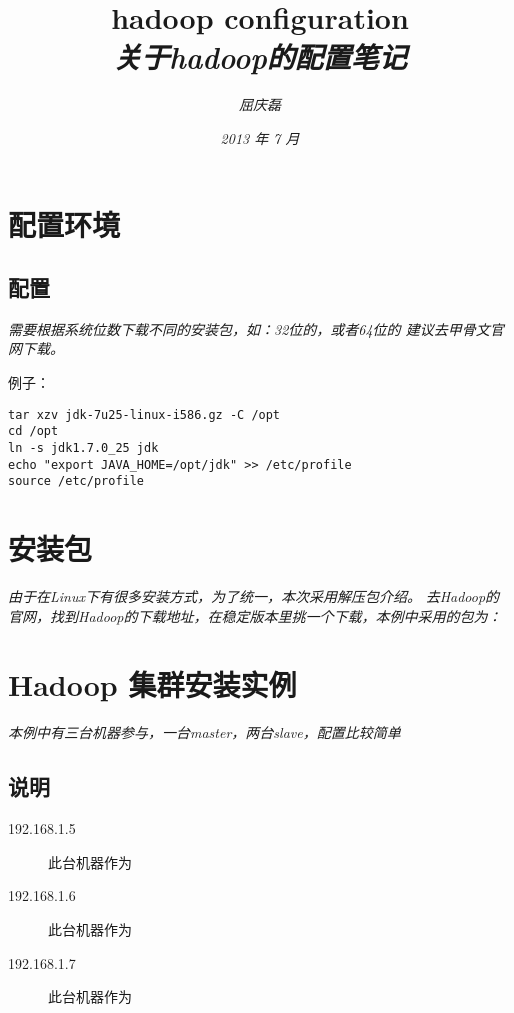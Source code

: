 \documentclass{article}
\begin{document}
\title{%
  {\huge \textsf{hadoop configuration}\\\smallskip}%
  {\small \textit{关于hadoop的配置笔记}}
}

\author{\textit{屈庆磊}\\[2mm]
       }

\date{\textit{2013 年 7 月}}

\maketitle
\begin{multicols}{2}
\tableofcontents
\end{multicols}

\section{配置环境}
\subsection{配置}
\textit{需要根据系统位数下载不同的安装包，如：32位的，或者64位的
建议去甲骨文官网下载。
}

\textsf{例子：}
\begin{verbatim}
tar xzv jdk-7u25-linux-i586.gz -C /opt
cd /opt
ln -s jdk1.7.0_25 jdk
echo "export JAVA_HOME=/opt/jdk" >> /etc/profile
source /etc/profile
\end{verbatim}

\section{安装包}
\textit{由于在Linux下有很多安装方式，为了统一，本次采用解压包介绍。}
\textit{去Hadoop的官网，找到Hadoop的下载地址，在稳定版本里挑一个下载，本例中采用的包为：}


\section{Hadoop 集群安装实例}
\textit{本例中有三台机器参与，一台master，两台slave，配置比较简单}

\subsection{说明}
\begin{description}
\item[192.168.1.5] 此台机器作为
\item[192.168.1.6] 此台机器作为
\item[192.168.1.7] 此台机器作为
\end{description}
\end{document}
